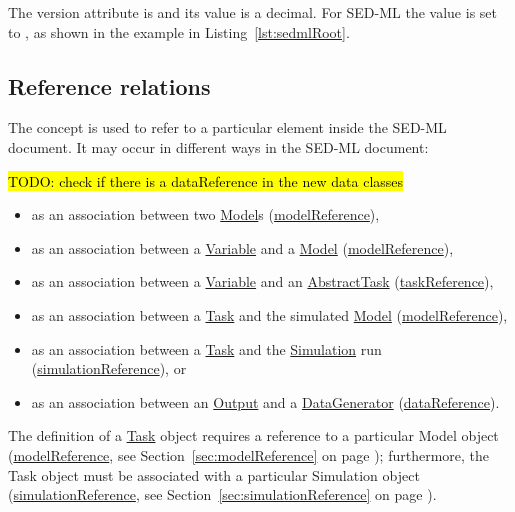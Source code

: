 The version attribute is  and its value is a  decimal. For SED-ML \currentLV the value is set to \code{\version}, as shown in the example in Listing~\ref{lst:sedmlRoot}.


\subsection{Reference relations}
\label{sec:reference}

The  concept is used to refer to a particular element inside the SED-ML document. It may occur in different ways in the SED-ML document:

\hl{TODO: check if there is a dataReference in the new data classes}

\begin{itemize}
	\item{as an association between two \hyperref[class:model]{Model}s (\hyperref[sec:modelReference]{modelReference}),}
	\item{as an association between a \hyperref[class:variable]{Variable} and a \hyperref[class:model]{Model} (\hyperref[sec:modelReference]{modelReference}),}
	\item{as an association between a \hyperref[class:variable]{Variable} and an \hyperref[class:abstractTask]{AbstractTask} (\hyperref[sec:taskReference]{taskReference}),}
	\item{as an association between a \hyperref[class:task]{Task} and the simulated \hyperref[class:model]{Model} (\hyperref[sec:modelReference]{modelReference}),}
	\item{as an association between a \hyperref[class:task]{Task} and the \hyperref[class:simulation]{Simulation} run (\hyperref[sec:simulationReference]{simulationReference}), or}
	\item{as an association between an \hyperref[class:output]{Output} and a \hyperref[class:dataGenerator]{DataGenerator} (\hyperref[sec:dataReference]{dataReference}).}
\end{itemize}

The definition of a \hyperref[class:task]{Task} object requires a reference to a particular Model object (\hyperref[sec:modelReference]{modelReference}, see Section~\ref{sec:modelReference} on page \pageref{sec:modelReference}); furthermore, the Task object must be associated with a particular Simulation object (\hyperref[sec:simulationReference]{simulationReference}, see Section~\ref{sec:simulationReference} on page \pageref{sec:simulationReference}).

